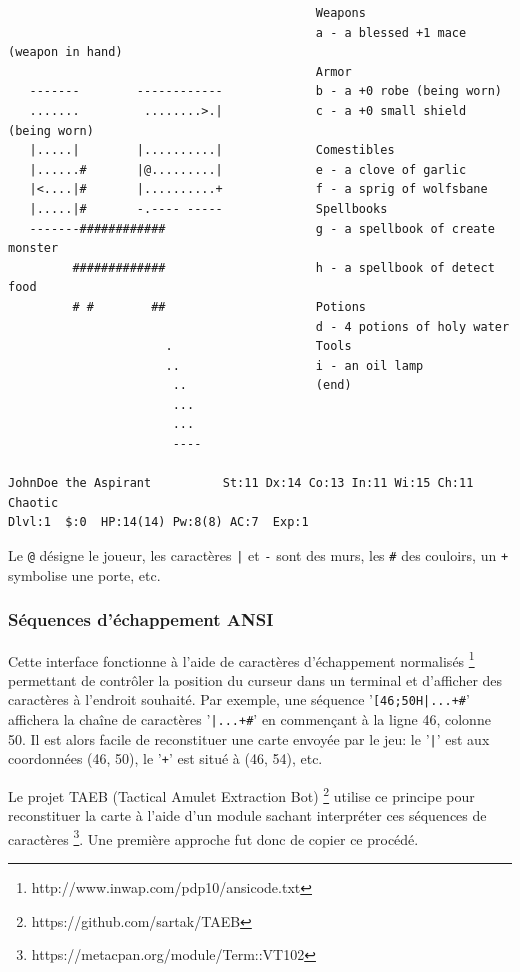 \documentclass[a4paper,11pt]{article}
\begin{document}
\begin{verbatim}
                                           Weapons
                                           a - a blessed +1 mace (weapon in hand)
                                           Armor
   -------        ------------             b - a +0 robe (being worn)
   .......         ........>.|             c - a +0 small shield (being worn)
   |.....|        |..........|             Comestibles
   |......#       |@.........|             e - a clove of garlic
   |<....|#       |..........+             f - a sprig of wolfsbane
   |.....|#       -.---- -----             Spellbooks
   -------############                     g - a spellbook of create monster
         #############                     h - a spellbook of detect food
         # #        ##                     Potions
                                           d - 4 potions of holy water
                      .                    Tools
                      ..                   i - an oil lamp
                       ..                  (end) 
                       ...
                       ...
                       ----

JohnDoe the Aspirant          St:11 Dx:14 Co:13 In:11 Wi:15 Ch:11  Chaotic
Dlvl:1  $:0  HP:14(14) Pw:8(8) AC:7  Exp:1
\end{verbatim}

Le \verb!@! désigne le joueur, les caractères \verb!|! et \verb!-! sont des murs, les \verb!#! des couloirs, un \verb!+! symbolise une porte, etc.


\subsubsection*{Séquences d'échappement ANSI}

Cette interface fonctionne à l'aide de caractères d'échappement normalisés \footnote{http://www.inwap.com/pdp10/ansicode.txt} permettant de contrôler la position du curseur dans un terminal et d'afficher des caractères à l'endroit souhaité. Par exemple, une séquence '\verb![46;50H|...+#!' affichera la chaîne de caractères '\verb!|...+#!' en commençant à la ligne 46, colonne 50. Il est alors facile de reconstituer une carte envoyée par le jeu: le '\verb!|!' est aux coordonnées (46, 50), le '\verb!+!' est situé à (46, 54), etc.
	
	Le projet TAEB (Tactical Amulet Extraction Bot) \footnote{https://github.com/sartak/TAEB} utilise ce principe pour reconstituer la carte à l'aide d'un module sachant interpréter ces séquences de caractères \footnote{https://metacpan.org/module/Term::VT102}. Une première approche fut donc de copier ce procédé.
\end{document}

